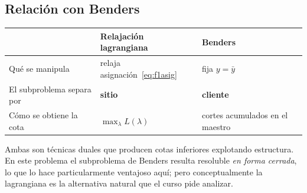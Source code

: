 \subsection{Relación con Benders}
\begin{center}
\begin{tabular}{lll}
\toprule
 & \textbf{Relajación lagrangiana} & \textbf{Benders} \\
\midrule
Qué se manipula & relaja asignación~\eqref{eq:f1asig} & fija $y=\bar y$ \\
El subproblema separa por & \textbf{sitio} & \textbf{cliente} \\
Cómo se obtiene la cota & $\max_\lambda L(\lambda)$ & cortes acumulados en el maestro \\
\bottomrule
\end{tabular}
\end{center}
Ambas son técnicas duales que producen cotas inferiores explotando estructura. En este problema
el subproblema de Benders resulta resoluble \emph{en forma cerrada}, lo que lo hace
particularmente ventajoso aquí; pero conceptualmente la lagrangiana es la alternativa natural
que el curso pide analizar.
